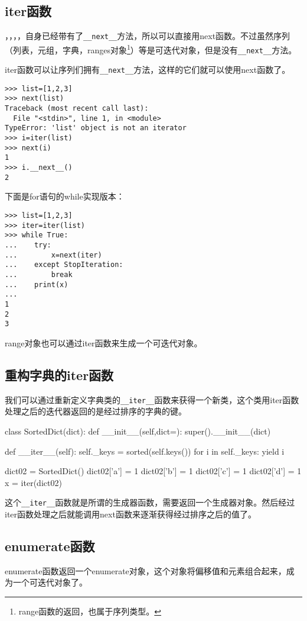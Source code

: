 \documentclass[12pt,oneside]{book}
\begin{document}
\begin{common-format}
\subsection{iter函数}
，，，，自身已经带有了\verb+__next__+方法，所以可以直接用next函数。不过虽然序列（列表，元组，字典，ranges对象\footnote{range函数的返回，也属于序列类型。}）等是可迭代对象，但是没有\verb+__next__+方法。

iter函数可以让序列们拥有\verb+__next__+方法，这样的它们就可以使用next函数了。

\begin{Verbatim}
>>> list=[1,2,3]
>>> next(list)
Traceback (most recent call last):
  File "<stdin>", line 1, in <module>
TypeError: 'list' object is not an iterator
>>> i=iter(list)
>>> next(i)
1
>>> i.__next__()
2
\end{Verbatim}

下面是for语句的while实现版本：
\begin{Verbatim}
>>> list=[1,2,3]
>>> iter=iter(list)
>>> while True:
...    try:
...        x=next(iter)
...    except StopIteration:
...        break
...    print(x)
... 
1
2
3
\end{Verbatim}

range对象也可以通过iter函数来生成一个可迭代对象。

\subsection{重构字典的iter函数}
我们可以通过重新定义字典类的\verb+__iter__+函数来获得一个新类，这个类用iter函数处理之后的迭代器返回的是经过排序的字典的键。
\begin{tcbpython}[]
class SortedDict(dict):
    def __init__(self,dict={}):
        super().__init__(dict)

    def __iter__(self):
        self._keys = sorted(self.keys())
        for i in self._keys:
            yield i

dict02 = SortedDict()
dict02['a'] = 1
dict02['b'] = 1
dict02['c'] = 1
dict02['d'] = 1
x = iter(dict02)
\end{tcbpython}
这个\verb+__iter__+函数就是所谓的生成器函数，需要返回一个生成器对象。然后经过iter函数处理之后就能调用next函数来逐渐获得经过排序之后的值了。



\subsection{enumerate函数}
enumerate函数返回一个enumerate对象，这个对象将偏移值和元素组合起来，成为一个可迭代对象了。


\end{common-format}
\end{document}
